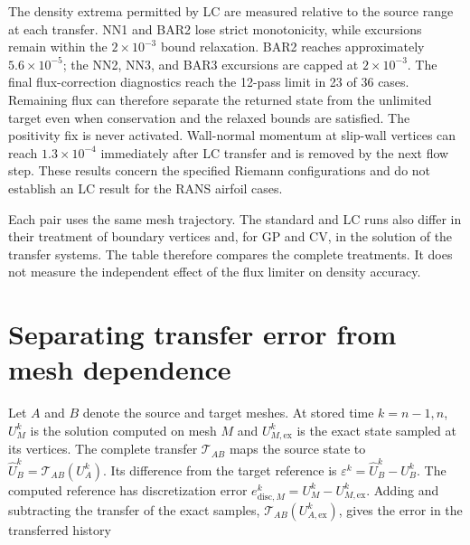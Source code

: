 \documentclass[11pt,a4paper]{article}
\newcommand{\eps}{\varepsilon}
\begin{document}
\begin{table}[!htbp]
\centering\footnotesize
\caption{Relative mass changes in the final CFD step and transfer, for mesh sequence 1 with remeshing every two steps. Standard is the usual transfer treatment; LC is the locally conservative flux correction. All values are normalized by initial mass.}
\label{tab:lc-budget-supp}
\end{table}
\FloatBarrier

The density extrema permitted by LC are measured relative to the source range at each transfer. NN1 and BAR2 lose strict monotonicity, while excursions remain within the $2\times10^{-3}$ bound relaxation. BAR2 reaches approximately $5.6\times10^{-5}$; the NN2, NN3, and BAR3 excursions are capped at $2\times10^{-3}$. The final flux-correction diagnostics reach the 12-pass limit in 23 of 36 cases. Remaining flux can therefore separate the returned state from the unlimited target even when conservation and the relaxed bounds are satisfied. The positivity fix is never activated. Wall-normal momentum at slip-wall vertices can reach $1.3\times10^{-4}$ immediately after LC transfer and is removed by the next flow step. These results concern the specified Riemann configurations and do not establish an LC result for the RANS airfoil cases.

Each pair uses the same mesh trajectory. The standard and LC runs also differ in their treatment of boundary vertices and, for GP and CV, in the solution of the transfer systems. The table therefore compares the complete treatments. It does not measure the independent effect of the flux limiter on density accuracy.

\FloatBarrier
\section{Separating transfer error from mesh dependence}
\label{supp:reference-decomposition}

Let $A$ and $B$ denote the source and target meshes. At stored time $k=n-1,n$, $U_M^k$ is the solution computed on mesh $M$ and $U_{M,\mathrm{ex}}^k$ is the exact state sampled at its vertices. The complete transfer $\mathcal T_{AB}$ maps the source state to $\widehat U_B^k=\mathcal T_{AB}(U_A^k)$. Its difference from the target reference is $\eps^k=\widehat U_B^k-U_B^k$. The computed reference has discretization error $e_{\mathrm{disc},M}^k=U_M^k-U_{M,\mathrm{ex}}^k$. Adding and subtracting the transfer of the exact samples, $\mathcal T_{AB}(U_{A,\mathrm{ex}}^k)$, gives the error in the transferred history
\end{document}
